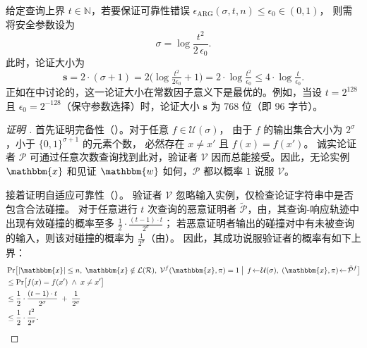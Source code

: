 \documentclass[american,singlepageview]{snargs-book-zh}
\newcommand{\Bits}{\{0,1\}}
\newcommand{\Malicious}[1]{\tilde{#1}}
\newcommand{\SomeSize}[1]{|#1|}
\newcommand{\Naturals}{\mathbb{N}}
\newcommand{\Relation}{\mathcal{R}}
\newcommand{\Language}{\mathcal{L}}
\newcommand{\GetLanguage}[1]{\Language(#1)}
\newcommand{\Instance}{\mathbbm{x}}
\newcommand{\Witness}{\mathbbm{w}}
\newcommand{\InstanceSize}{n}
\newcommand{\ProtoProver}{P}
\newcommand{\ProtoVerifier}{V}
\newcommand{\ProtoSoundnessError}{\epsilon}
\newcommand{\ARGSubscript}{\scriptscriptstyle\mathrm{ARG}}
\newcommand{\ARGFormat}[1]{\mathcal{#1}}
\newcommand{\ARGProver}{\ARGFormat{\ProtoProver}}
\newcommand{\ARGVerifier}{\ARGFormat{\ProtoVerifier}}
\newcommand{\ARGString}{\pi}
\newcommand{\ARGTargetSoundnessError}{\ProtoSoundnessError_{0}}
\newcommand{\ARGSoundnessError}{\ProtoSoundnessError_{\ARGSubscript}}
\newcommand{\ARGComplexityFormat}[1]{\mathbf{#1}}
\newcommand{\ARGLength}{\ARGComplexityFormat{s}}
\newcommand{\ROFunction}{f}
\newcommand{\ROQueryBound}{t}
\newcommand{\RODistribution}[1]{\mathcal{U}(#1)}
\newcommand{\ROQuery}{x}
\newcommand{\ROOutputSize}{\sigma}
\newcommand{\ROPExpression}[1]{\frac{1}{2^{#1}}}
\newcommand{\ROCRExpression}[2]{\frac{1}{2} \cdot \frac{(#2-1) \cdot #2}{2^{#1}}}
\newcommand{\ROCommonExpression}[2]{\frac{1}{2} \cdot \frac{#2^2}{2^{#1}}}
\begin{document}
给定查询上界 $\ROQueryBound\in\Naturals$，若要保证可靠性错误
$\ARGSoundnessError(\ROOutputSize,\ROQueryBound,\InstanceSize)\le\ARGTargetSoundnessError\in(0,1)$，
则需将安全参数设为
\[
\ROOutputSize = \log\frac{\ROQueryBound^2}{2\,\ARGTargetSoundnessError}.
\]
此时，论证大小为
\[
\ARGLength
= 2\cdot(\ROOutputSize+1)
= 2\!\bigl(\log\tfrac{\ROQueryBound^2}{2\ARGTargetSoundnessError}+1\bigr)
= 2\cdot\log\tfrac{\ROQueryBound^2}{\ARGTargetSoundnessError}
\le 4\cdot\log\tfrac{\ROQueryBound}{\ARGTargetSoundnessError}.
\]
正如在中讨论的，这一论证大小在常数因子意义下是最优的。例如，当设
$\ROQueryBound=2^{128}$ 且 $\ARGTargetSoundnessError=2^{-128}$（保守参数选择）时，论证大小 $\ARGLength$ 为 768 位（即 96 字节）。

\begin{proof}[证明 ]
首先证明完备性（）。对于任意
$\ROFunction\in\RODistribution{\ROOutputSize}$，
由于 $\ROFunction$ 的输出集合大小为 $2^{\ROOutputSize}$，小于
$\Bits^{\ROOutputSize+1}$ 的元素个数，
必然存在 $\ROQuery\neq\ROQuery'$ 且
$\ROFunction(\ROQuery)=\ROFunction(\ROQuery')$。
诚实论证者 $\ARGProver$ 可通过任意次数查询找到此对，验证者
$\ARGVerifier$ 因而总能接受。因此，无论实例 $\Instance$ 和见证
$\Witness$ 如何，$\ARGProver$ 都以概率 $1$ 说服 $\ARGVerifier$。

接着证明自适应可靠性（）。
验证者 $\ARGVerifier$ 忽略输入实例，仅检查论证字符串中是否包含合法碰撞。
对于任意进行 $\ROQueryBound$ 次查询的恶意证明者
$\Malicious{\ARGProver}$，由，其查询-响应轨迹中
出现有效碰撞的概率至多 $\ROCRExpression{\ROOutputSize}{\ROQueryBound}$；
若恶意证明者输出的碰撞对中有未被查询的输入，则该对碰撞的概率为
$\ROPExpression{\ROOutputSize}$（由）。
因此，其成功说服验证者的概率有如下上界：
\begin{align*}
& \Pr\bigl[
  \SomeSize{\Instance}\le\InstanceSize,\;
  \Instance\notin\GetLanguage{\Relation},\;
  \ARGVerifier^{\ROFunction}(\Instance,\ARGString)=1
  \bigm|\,
  \ROFunction\!\gets\!\RODistribution{\ROOutputSize},\;
  (\Instance,\ARGString)\!\gets\!\Malicious{\ARGProver}^{\ROFunction}
\bigr]
\\ &\le
  \Pr\bigl[\ROFunction(\ROQuery)=\ROFunction(\ROQuery')\;\wedge\;\ROQuery\neq\ROQuery'\bigr]
\\ &\le
  \ROCRExpression{\ROOutputSize}{\ROQueryBound}
  \;+\;
  \frac{1}{2^{\ROOutputSize}}
\\ &\le
  \ROCommonExpression{\ROOutputSize}{\ROQueryBound}.
\end{align*}
\end{proof}
\end{document}
